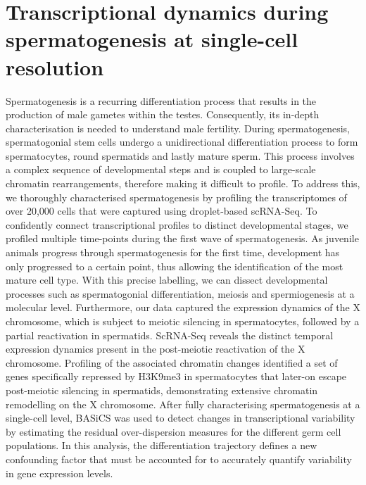 
\chapter{Transcriptional dynamics during spermatogenesis at single-cell resolution}  

\graphicspath{{"../../Dropbox (Cambridge  University)/Figures_for_thesis/Chapter3/"}}

\begin{Abstract}
Spermatogenesis is a recurring differentiation process that results in the production of male gametes within the testes. Consequently, its in-depth characterisation is needed to understand male fertility. During spermatogenesis, spermatogonial stem cells undergo a unidirectional differentiation process to form spermatocytes, round spermatids and lastly mature sperm. This process involves a complex sequence of developmental steps and is coupled to large-scale chromatin rearrangements, therefore making it difficult to profile.
To address this, we thoroughly characterised spermatogenesis by   profiling the transcriptomes of over 20,000 cells that were captured using droplet-based scRNA-Seq. To confidently connect transcriptional profiles to distinct developmental stages, we profiled multiple time-points during the first wave of spermatogenesis. As juvenile animals progress through spermatogenesis for the first time, development has only progressed to a certain point, thus allowing the identification of the most mature cell type. With this precise labelling, we can dissect developmental processes such as spermatogonial differentiation, meiosis and spermiogenesis at a molecular level. Furthermore, our data captured the expression dynamics of the X chromosome, which is subject to meiotic silencing in spermatocytes, followed by a partial reactivation in spermatids. ScRNA-Seq reveals the distinct temporal expression dynamics present in the post-meiotic reactivation of the X chromosome. Profiling of the associated chromatin changes identified a set of genes specifically repressed by H3K9me3 in spermatocytes that later-on escape post-meiotic silencing in spermatids, demonstrating extensive chromatin remodelling on the X chromosome. After fully characterising spermatogenesis at a single-cell level, BASiCS was used to detect changes in transcriptional variability by estimating the residual over-dispersion measures for the different germ cell populations. In this analysis, the differentiation trajectory defines a new confounding factor that must be accounted for to accurately quantify variability in gene expression levels.  
\end{Abstract}

